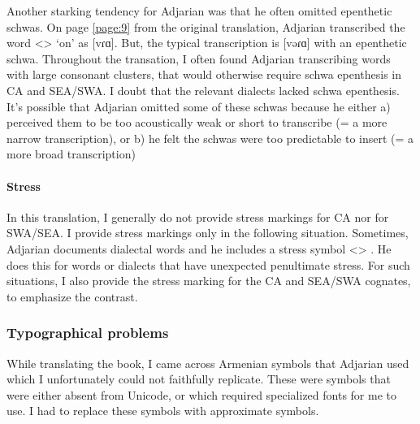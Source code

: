 Another starking tendency for Adjarian was that he often omitted epenthetic schwas. On page \ref{page:9} from the original translation, Adjarian transcribed the word <> `on' as [vɾɑ]. But, the typical transcription is [vəɾɑ] with an epenthetic schwa. Throughout the transation, I often found Adjarian transcribing words with large consonant clusters, that would otherwise require schwa epenthesis in CA and SEA/SWA. I doubt that the relevant dialects lacked schwa epenthesis. It's possible that  Adjarian omitted some of these schwas because he either a) perceived them to be too acoustically weak or short to transcribe (= a more narrow transcription), or b) he felt the schwas were too predictable to insert (= a more broad transcription) 



\paragraph{Stress}
In this translation, I generally do not provide stress markings for CA nor for SWA/SEA. I provide stress markings only in the following situation. Sometimes, Adjarian documents dialectal words and he includes a stress symbol <> . He does this for words or dialects that have unexpected penultimate stress. For such situations, I also provide the stress marking for the CA and SEA/SWA cognates, to emphasize the contrast. 

\subsubsection{Typographical problems}\label{sec:HossepIntro:phonotransc:adj:typograph}

While translating the book, I came across Armenian symbols that Adjarian used which I unfortunately could not faithfully replicate. These were symbols that were either absent from Unicode, or which required specialized fonts for me to use. I had to replace these symbols with approximate symbols. 

